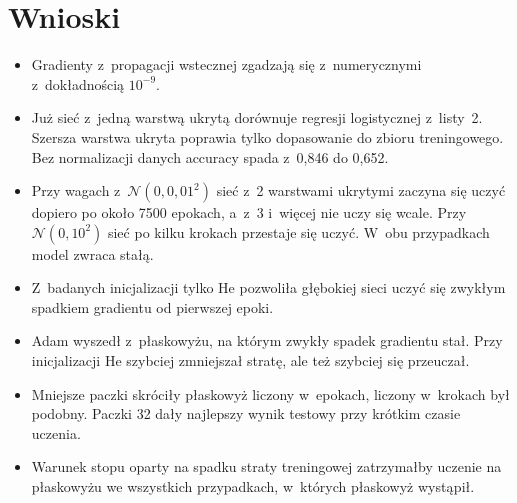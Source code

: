 \documentclass[11pt,a4paper]{article}
\begin{document}
\section{Wnioski}
\begin{itemize}
  \item Gradienty z~propagacji wstecznej zgadzają się z~numerycznymi z~dokładnością $10^{-9}$.
  \item Już sieć z~jedną warstwą ukrytą dorównuje regresji logistycznej z~listy~2. Szersza warstwa
    ukryta poprawia tylko dopasowanie do zbioru treningowego. Bez normalizacji danych accuracy
    spada z~0,846 do 0,652.
  \item Przy wagach z~$\mathcal{N}(0, 0{,}01^2)$ sieć z~2 warstwami ukrytymi zaczyna się uczyć
    dopiero po około 7500 epokach, a~z~3 i~więcej nie uczy się wcale. Przy $\mathcal{N}(0, 10^2)$
    sieć po kilku krokach przestaje się uczyć. W~obu przypadkach model zwraca stałą.
  \item Z~badanych inicjalizacji tylko He pozwoliła głębokiej sieci uczyć się zwykłym spadkiem
    gradientu od pierwszej epoki.
  \item Adam wyszedł z~płaskowyżu, na którym zwykły spadek gradientu stał. Przy inicjalizacji He
    szybciej zmniejszał stratę, ale też szybciej się przeuczał.
  \item Mniejsze paczki skróciły płaskowyż liczony w~epokach, liczony w~krokach był podobny.
    Paczki 32 dały najlepszy wynik testowy przy krótkim czasie uczenia.
  \item Warunek stopu oparty na spadku straty treningowej zatrzymałby uczenie na płaskowyżu
    we wszystkich przypadkach, w~których płaskowyż wystąpił.
\end{itemize}
\end{document}
